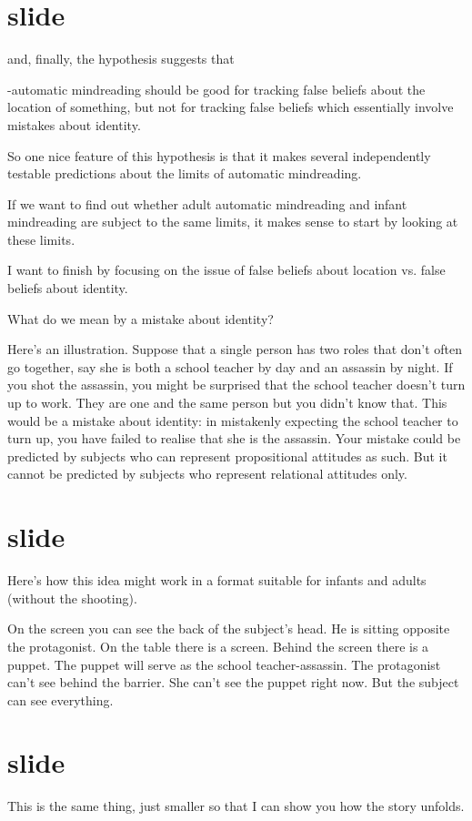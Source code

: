 \documentclass[14pt,\papersize]{extarticle}
\begin{document}
\section{slide}

and, finally, the hypothesis suggests that

-automatic mindreading should be good for tracking false beliefs about the location of something,
but not for tracking false beliefs which essentially involve mistakes about identity.

So one nice feature of this hypothesis is that it makes several independently testable predictions about the limits of automatic mindreading.

If we want to find out whether   adult automatic mindreading and infant mindreading are subject to the same limits,
it makes sense to start by looking at these limits.

I want to finish by focusing on the issue of false beliefs about location vs. false beliefs about identity.

What do we mean by a mistake about identity?

Here's an illustration.
Suppose that a single person has two roles that don't often go together,
say she is both a school teacher  by day and an assassin by night.
If you shot the assassin, you might be surprised that the school teacher doesn't turn up to work.
They are one and the same person but you didn't know that.
This would be a mistake about identity: in mistakenly expecting the school teacher to turn up, you have failed to realise that she is the assassin.
Your mistake could be predicted by subjects who can represent propositional attitudes as such.
But it cannot be predicted by subjects who represent relational attitudes only.


\section{slide}
Here's how this idea might work in a format suitable for infants and adults (without the shooting).

On the screen you can see the back of the subject's head.
He is sitting opposite the protagonist.
On the table there is a screen.
Behind the screen there is a puppet.
The puppet will serve as the school teacher-assassin.
The protagonist can't see behind the barrier.
She can't see the puppet right now.
But the subject can see everything.


\section{slide}
This is the same thing, just smaller so that I can show you how the story unfolds.
\end{document}
